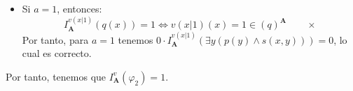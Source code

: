 \documentclass[12pt]{article}
\renewcommand{\bf}[1]{\mathbf{#1}}
\begin{document}
\begin{ejercicio}
\begin{enumerate}
\begin{itemize}
            \item Si $a=1$, entonces:
            \begin{equation*}
                I_{\bf{A}}^{v(x|1)}(q(x)) = 1 \Longleftrightarrow v(x|1)(x) = 1 \in (q)^{\bf{A}} \qquad \times
            \end{equation*}
            Por tanto, para $a=1$ tenemos $0\cdot I_{\bf{A}}^{v(x|1)}(\exists y\left( p(y) \land s(x,y) \right)) = 0$, lo cual es correcto.
        \end{itemize}
        Por tanto, tenemos que $I_{\bf{A}}^v(\varphi_2) = 1$.
        \begin{comment}
        Por tanto, para cada $a\in A$ tal que $I_{\bf{A}}^{v(x|a)}(q(x)) = 1$, por la segunda fórmula hemos deducido que $I_{\bf{A}}^{v(x|a)}(\exists y\left( p(y) \land s(x,y) \right)) = 1$.
        Es decir, para cada $a\in A$ tal que $a\in (q)^{\bf{A}}$, existe un $b\in A$ tal que $b\in (p)^{\bf{A}}$ y $\langle a, b\rangle\in (s)^{\bf{A}}$.
        \end{comment}



\end{enumerate}
\end{ejercicio}
\end{document}
